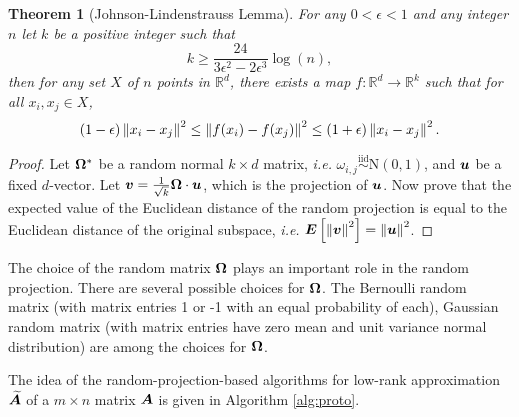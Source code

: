 \documentclass[12pt]{article}
\newtheorem{theorem}{Theorem}
\begin{document}
\begin{theorem}[Johnson-Lindenstrauss Lemma]
For any $0 < \epsilon < 1$ and any integer $n$ let $k$ be a positive integer such that
\[
k \geq \frac{24}{3\epsilon^2 - 2\epsilon^3} \log(n),
\]
then for any set $X$ of $n$ points in $\mathbb{R}^d$, there exists a map $f : \mathbb{R}^d \rightarrow \mathbb{R}^k$ such that for all $x_i, x_j \in X$,
\[
(1 - \epsilon)\left\Vert {x_i - x_j} \right\Vert^2 \leq \left\Vert {f(x_i) - f(x_j)} \right\Vert^2 \leq (1 + \epsilon)\left\Vert {x_i - x_j} \right\Vert^2.
\]
\end{theorem}
\begin{proof}
Let $\bm{\Omega}^{*}$ be a random normal $k \times d$ matrix, \textit{i.e.} $\omega_{i,j} \overset{\text{iid}}{\sim} \mathrm{N}(0, 1)$, and $\bm{u}$ be a fixed $d$-vector. Let $\bm{v} = \frac{1}{\sqrt{k}}\bm{\Omega} \cdot \bm{u}$, which is the projection of $\bm{u}$.
Now prove that the expected value of the Euclidean distance of the random projection is equal to the Euclidean distance of the
original subspace, \textit{i.e.} $\bm{E}
\left[ \left\Vert {\bm{v}} \right\Vert^2 \right] = \left\Vert {\bm{u}} \right\Vert^2$.
\end{proof}

The choice of the random matrix $\bm{\Omega}$ plays an important role in the random projection. There are several possible choices for $\bm{\Omega}$. The Bernoulli random matrix (with matrix entries 1 or -1 with an equal probability of each), Gaussian random matrix (with matrix entries have zero mean and unit variance normal distribution) are among the
choices for $\bm{\Omega}$.

The idea of the random-projection-based algorithms for low-rank approximation $\widetilde{\bm{A}}$ of a $m\times n$ matrix $\bm{A}$ is given in Algorithm \ref{alg:proto}.
\end{document}
